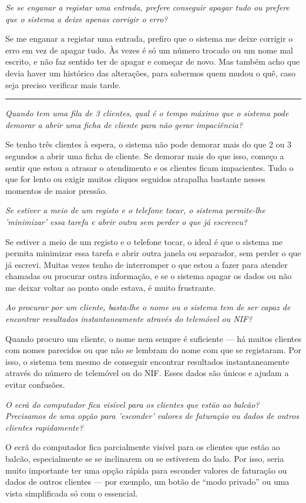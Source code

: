 \documentclass[11pt,a4paper]{article}
\newcommand{\pergunta}[1]{\item[P:] \textit{#1}}
\newcommand{\resposta}[1]{\item[R:] #1}
\begin{document}
\begin{transcription}
		\pergunta{Se se enganar a registar uma entrada, prefere conseguir apagar tudo ou prefere que o sistema a deixe apenas corrigir o erro?}
		\resposta{Se me enganar a registar uma entrada, prefiro que o sistema me deixe corrigir o erro em vez de apagar tudo. Às vezes é só um número trocado ou um nome mal escrito, e não faz sentido ter de apagar e começar de novo. Mas também acho que devia haver um histórico das alterações, para sabermos quem mudou o quê, caso seja preciso verificar mais tarde.}
		
		\vspace{0.8cm}
		
		\hrule
			
		\vspace{0.8cm}
		
		\pergunta{Quando tem uma fila de 3 clientes, qual é o tempo máximo que o sistema pode demorar a abrir uma ficha de cliente para não gerar impaciência?}
		\resposta{Se tenho três clientes à espera, o sistema não pode demorar mais do que 2 ou 3 segundos a abrir uma ficha de cliente. Se demorar mais do que isso, começo a sentir que estou a atrasar o atendimento e os clientes ficam impacientes. Tudo o que for lento ou exigir muitos cliques seguidos atrapalha bastante nesses momentos de maior pressão.}
		
		\pergunta{Se estiver a meio de um registo e o telefone tocar, o sistema permite-lhe 'minimizar' essa tarefa e abrir outra sem perder o que já escreveu?}
		\resposta{Se estiver a meio de um registo e o telefone tocar, o ideal é que o sistema me permita minimizar essa tarefa e abrir outra janela ou separador, sem perder o que já escrevi. Muitas vezes tenho de interromper o que estou a fazer para atender chamadas ou procurar outra informação, e se o sistema apagar os dados ou não me deixar voltar ao ponto onde estava, é muito frustrante.}
			
		\pergunta{Ao procurar por um cliente, basta-lhe o nome ou o sistema tem de ser capaz de encontrar resultados instantaneamente através do telemóvel ou NIF?}
		\resposta{Quando procuro um cliente, o nome nem sempre é suficiente — há muitos clientes com nomes parecidos ou que não se lembram do nome com que se registaram. Por isso, o sistema tem mesmo de conseguir encontrar resultados instantaneamente através do número de telemóvel ou do NIF. Esses dados são únicos e ajudam a evitar confusões.}
		
		\pergunta{O ecrã do computador fica visível para os clientes que estão ao balcão? Precisamos de uma opção para 'esconder' valores de faturação ou dados de outros clientes rapidamente?}
		\resposta{O ecrã do computador fica parcialmente visível para os clientes que estão ao balcão, especialmente se se inclinarem ou se estiverem do lado. Por isso, seria muito importante ter uma opção rápida para esconder valores de faturação ou dados de outros clientes — por exemplo, um botão de “modo privado” ou uma vista simplificada só com o essencial.}
		

\end{transcription}
\end{document}
